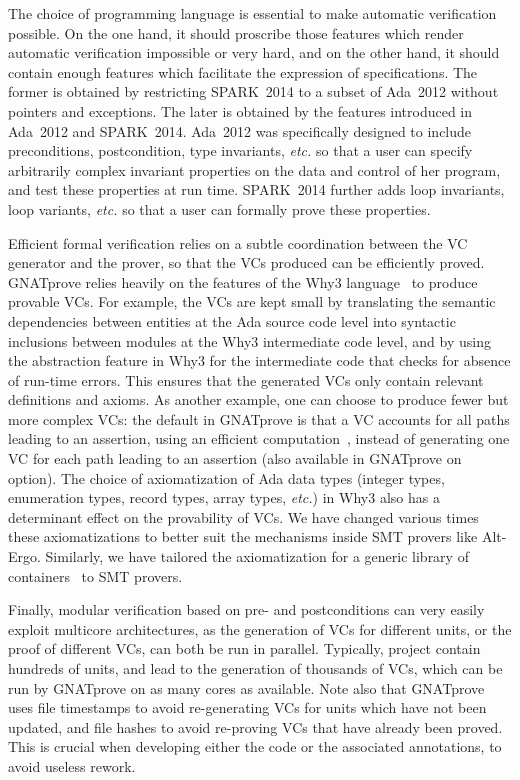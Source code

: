 \documentclass[sttt,draft]{svjour}
\newcommand{\gnatprove}{GNATprove\xspace}
\newcommand{\newspark}{SPARK~2014\xspace}
\newcommand{\adatwtw}{Ada~2012\xspace}
\newcommand{\etc}{\textit{etc.}\xspace}
\begin{document}
The choice of programming language is essential to make automatic verification
possible. On the one hand, it should proscribe those features which render
automatic verification impossible or very hard, and on the other hand, it
should contain enough features which facilitate the expression of
specifications. The former is obtained by restricting \newspark to a subset of
\adatwtw without pointers and exceptions. The later is obtained by the features
introduced in \adatwtw and \newspark. \adatwtw was specifically designed to
include preconditions, postcondition, type invariants, \etc so that a user can
specify arbitrarily complex invariant properties on the data and control of her
program, and test these properties at run time. \newspark further adds loop
invariants, loop variants, \etc so that a user can formally prove these
properties.

Efficient formal verification relies on a subtle coordination between the VC
generator and the prover, so that the VCs produced can be efficiently
proved. \gnatprove relies heavily on the features of the Why3
language~\cite{guitton2011boogie} to produce provable VCs. For example, the VCs
are kept small by translating the semantic dependencies between entities at the
Ada source code level into syntactic inclusions between modules at the Why3
intermediate code level, and by using the abstraction feature in Why3 for the
intermediate code that checks for absence of run-time errors. This ensures that
the generated VCs only contain relevant definitions and axioms. As another
example, one can choose to produce fewer but more complex VCs: the default in
\gnatprove is that a VC accounts for all paths leading to an assertion, using
an efficient computation~\cite{leino2005ipl}, instead of generating one VC for
each path leading to an assertion (also available in \gnatprove on option). The
choice of axiomatization of Ada data types (integer types, enumeration types,
record types, array types, \etc) in Why3 also has a determinant effect on the
provability of VCs. We have changed various times these axiomatizations to
better suit the mechanisms inside SMT provers like Alt-Ergo. Similarly, we have
tailored the axiomatization for a generic library of
containers~\cite{dross:2011:tap} to SMT provers.

Finally, modular verification based on pre- and postconditions can very easily
exploit multicore architectures, as the generation of VCs for different units,
or the proof of different VCs, can both be run in parallel. Typically, project
contain hundreds of units, and lead to the generation of thousands of VCs,
which can be run by \gnatprove on as many cores as available. Note also that
\gnatprove uses file timestamps to avoid re-generating VCs for units which have
not been updated, and file hashes to avoid re-proving VCs that have already
been proved. This is crucial when developing either the code or the associated
annotations, to avoid useless rework.
\end{document}
